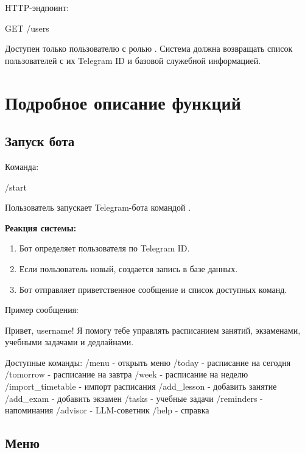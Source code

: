 \documentclass[10pt,a4paper,final]{article} %
\begin{document}
HTTP-эндпоинт:

\begin{Code}
GET /users
\end{Code}

Доступен только пользователю с ролью . Система должна возвращать список пользователей с их Telegram ID и базовой служебной информацией.

\section{Подробное описание функций}

\subsection{Запуск бота}

Команда:

\begin{Code}
/start
\end{Code}

Пользователь запускает Telegram-бота командой .

\textbf{Реакция системы:}

\begin{enumerate}
    \item Бот определяет пользователя по Telegram ID.
    \item Если пользователь новый, создается запись в базе данных.
    \item Бот отправляет приветственное сообщение и список доступных команд.
\end{enumerate}

Пример сообщения:

\begin{Code}
Привет, {username}! Я помогу тебе управлять расписанием занятий, экзаменами, учебными задачами и дедлайнами.

Доступные команды:
/menu - открыть меню
/today - расписание на сегодня
/tomorrow - расписание на завтра
/week - расписание на неделю
/import\_timetable - импорт расписания
/add\_lesson - добавить занятие
/add\_exam - добавить экзамен
/tasks - учебные задачи
/reminders - напоминания
/advisor - LLM-советник
/help - справка
\end{Code}

\subsection{Меню}
\end{document}
